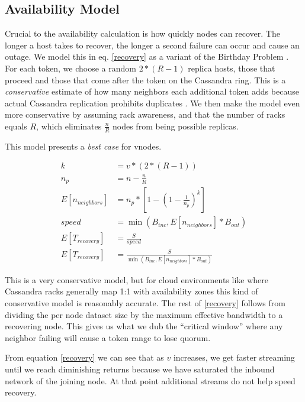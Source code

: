 \documentclass{article}
\begin{document}
\subsection{Availability Model}

Crucial to the availability calculation is how quickly nodes can recover. The
longer a host takes to recover, the longer a second failure can occur and cause
an outage. We model this in eq. \ref{recovery} as a variant of the Birthday
Problem \cite{neighbors}. For each token, we choose a random $2 * (R - 1)$
replica hosts, those that proceed and those that come after the token on the
Cassandra ring. This is a \textit{conservative} estimate of how many neighbors
each additional token adds because actual Cassandra replication prohibits
duplicates \cite{replication}. We then make the model even more conservative by
assuming rack awareness, and that the number of racks equals $R$, which
eliminates $\frac{n}{R}$ nodes from being possible replicas.

This model presents a \textit{best case} for vnodes.

\begin{subequations} \label{recovery}
    \begin{align}
        k & = v * (2 * (R - 1)) \\ \label{recoverya}
        n_{p} & = n - \frac{n}{R} \\
        E[n_{neighbors}] & = n_{p} * [1 - (1-\frac{1}{n_{p}})^k] \label{recoveryc} \\
        speed & = \min(B_{inc}, E[n_{neighbors}] * B_{out}) \\
        E[T_{recovery}] & = \frac{S}{speed} \\
        E[T_{recovery}] & = \frac{S}{\min(B_{inc}, E[n_{neighbors}] * B_{out})}
    \end{align}
\end{subequations}

This is a very conservative model, but for cloud environments like where
Cassandra racks generally map 1:1 with availability zones this kind of
conservative model is reasonably accurate. The rest of \ref{recovery} follows
from dividing the per node dataset size by the maximum effective bandwidth to
a recovering node. This gives us what we dub the ``critical window''
where any neighbor failing will cause a token range to lose quorum.

From equation \ref{recovery} we can see that as $v$ increases, we get faster
streaming until we reach diminishing returns because we have saturated the
inbound network of the joining node. At that point additional streams do not
help speed recovery.
\end{document}
